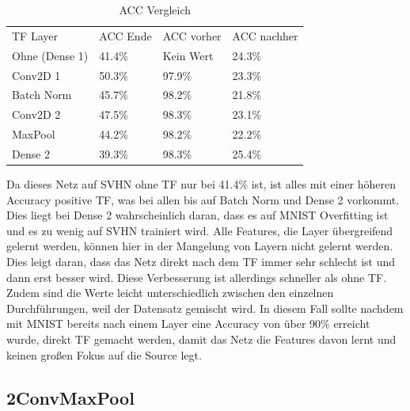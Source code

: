     \begin{table}[h!]
        \begin{center}
            \caption{ACC Vergleich}
            \label{tab1:Table}
            \begin{tabular}{l|l|l|l}
                TF Layer & ACC Ende & ACC vorher & ACC nachher \\
                Ohne (Dense 1) & 41.4\% & Kein Wert & 24.3\% \\
                Conv2D 1 & 50.3\% & 97.9\% & 23.3\% \\
                Batch Norm & 45.7\% & 98.2\% & 21.8\% \\
                Conv2D 2 & 47.5\% & 98.3\% & 23.1\% \\
                MaxPool & 44.2\% & 98.2\% & 22.2\% \\
                Dense 2 & 39.3\% & 98.3\% & 25.4\% \\
            \end{tabular}
        \end{center}
    \end{table}
    Da dieses Netz auf SVHN ohne TF nur bei 41.4\% ist, ist alles mit einer höheren Accuracy 
    positive TF, was bei allen bis auf Batch Norm und Dense 2 vorkommt. Dies liegt bei Dense 2 
    wahrscheinlich daran, dass es auf MNIST Overfitting ist und es zu wenig auf SVHN trainiert wird. 
    Alle Features, die Layer übergreifend gelernt werden, können hier in der Mangelung von Layern 
    nicht gelernt werden. Dies leigt daran, dass das Netz direkt nach dem TF immer sehr schlecht ist 
    und dann erst besser wird. Diese Verbesserung ist allerdings schneller als ohne TF. Zudem 
    sind die Werte leicht unterschiedlich zwischen den einzelnen Durchführungen, weil der 
    Datensatz gemischt wird. 
    In diesem Fall sollte nachdem mit MNIST bereits nach einem Layer eine Accuracy von über 90\% 
    erreicht wurde, direkt TF gemacht werden, damit das Netz die Features davon lernt und keinen 
    großen Fokus auf die Source legt. 

\subsection{2ConvMaxPool}

